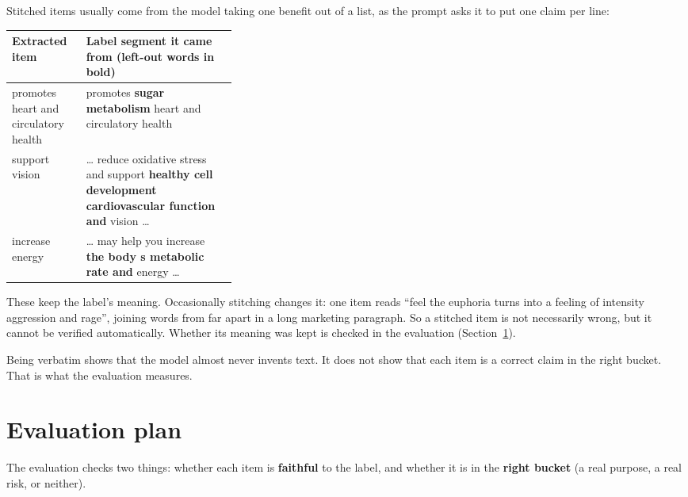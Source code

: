 \documentclass[10pt,a4paper]{article}
\begin{document}
Stitched items usually come from the model taking one benefit out of a list, as the prompt asks it to
put one claim per line:

\begin{table}[H]
\small
\begin{tabularx}{\linewidth}{@{}>{\raggedright\arraybackslash}p{0.33\linewidth} L@{}}
\toprule
Extracted item & Label segment it came from (left-out words in bold) \\
\midrule
promotes heart and circulatory health & promotes \textbf{sugar metabolism} heart and circulatory health \\
support vision & \ldots{} reduce oxidative stress and support \textbf{healthy cell development
  cardiovascular function and} vision \ldots \\
increase energy & \ldots{} may help you increase \textbf{the body s metabolic rate and} energy \ldots \\
\bottomrule
\end{tabularx}
\end{table}

These keep the label's meaning. Occasionally stitching changes it: one item reads ``feel the euphoria
turns into a feeling of intensity aggression and rage'', joining words from far apart in a long
marketing paragraph. So a stitched item is not necessarily wrong, but it cannot be verified
automatically. Whether its meaning was kept is checked in the evaluation (Section~\ref{sec:eval}).

Being verbatim shows that the model almost never invents text. It does not show that each item is a
correct claim in the right bucket. That is what the evaluation measures.

\section{Evaluation plan}\label{sec:eval}

The evaluation checks two things: whether each item is \textbf{faithful} to the label, and whether it
is in the \textbf{right bucket} (a real purpose, a real risk, or neither).
\end{document}
